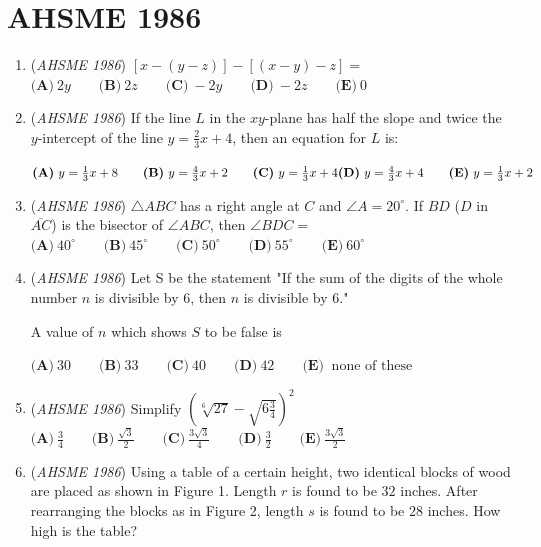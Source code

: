 \section{AHSME 1986}
        \begin{enumerate}
        	\item (\textit{AHSME 1986}) $[x-(y-z)] - [(x-y) - z] =$
$\textbf{(A)}\ 2y \qquad \textbf{(B)}\ 2z \qquad \textbf{(C)}\ -2y \qquad \textbf{(D)}\ -2z \qquad \textbf{(E)}\ 0$


	\item (\textit{AHSME 1986}) If the line $L$ in the $xy$-plane has half the slope and twice the $y$-intercept of the line $y = \frac{2}{3} x + 4$, then an equation for $L$ is:


 $\textbf{(A)}\ y = \frac{1}{3} x + 8 \qquad \textbf{(B)}\ y = \frac{4}{3} x + 2 \qquad \textbf{(C)}\ y =\frac{1}{3}x+4\qquad\\  \textbf{(D)}\ y =\frac{4}{3}x+4\qquad \textbf{(E)}\ y =\frac{1}{3}x+2$


	\item (\textit{AHSME 1986}) $\triangle ABC$ has a right angle at $C$ and $\angle A = 20^\circ$. If $BD$ ($D$ in $\overline{AC}$) is the bisector of $\angle ABC$, then $\angle BDC =$
$\textbf{(A)}\ 40^\circ \qquad \textbf{(B)}\ 45^\circ \qquad \textbf{(C)}\ 50^\circ \qquad \textbf{(D)}\ 55^\circ\qquad \textbf{(E)}\ 60^\circ$


	\item (\textit{AHSME 1986}) Let S be the statement 
"If the sum of the digits of the whole number $n$ is divisible by $6$, then $n$ is divisible by $6$."


 A value of $n$ which shows $S$ to be false is


 $\textbf{(A)}\ 30 \qquad \textbf{(B)}\ 33 \qquad \textbf{(C)}\ 40 \qquad \textbf{(D)}\ 42 \qquad \textbf{(E)}\ \text{ none of these}$


	\item (\textit{AHSME 1986}) Simplify $\left(\sqrt[6]{27} - \sqrt{6 \frac{3}{4} }\right)^2$
$\textbf{(A)}\ \frac{3}{4} \qquad \textbf{(B)}\ \frac{\sqrt 3}{2} \qquad \textbf{(C)}\ \frac{3\sqrt 3}{4}\qquad \textbf{(D)}\ \frac{3}{2}\qquad \textbf{(E)}\ \frac{3\sqrt 3}{2}$


	\item (\textit{AHSME 1986}) Using a table of a certain height, two identical blocks of wood are placed as shown in Figure 1.  Length $r$ is found to be $32$ inches.  After rearranging the blocks as in Figure 2, length $s$ is found to be $28$ inches.  How high is the table?



\end{enumerate}
